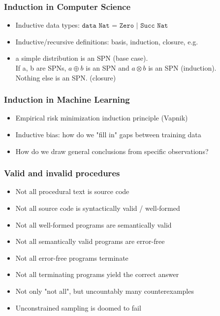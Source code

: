 \documentclass{beamer}
\begin{document}
  \begin{frame}
    \frametitle{Induction in Computer Science}
    \begin{itemize}
      \item Inductive data types: $\texttt{data Nat = Zero | Succ Nat}$
      \item Inductive/recursive definitions: basis, induction, closure, e.g.
      \item a simple distribution is an SPN (base case). \\If a, b are SPNs, $a \oplus b$ is an SPN and $a \otimes b$ is an SPN (induction).\\ Nothing else is an SPN. (closure)
    \end{itemize}
  \end{frame}

  \begin{frame}
    \frametitle{Induction in Machine Learning}
    \begin{itemize}
      \item Empirical risk minimization induction principle (Vapnik)
      \item Inductive bias: how do we "fill in" gaps between training data
      \item How do we draw general conclusions from specific observations?
    \end{itemize}
  \end{frame}


  \begin{frame}
    \frametitle{Valid and invalid procedures}
    \begin{itemize}
      \item Not all procedural text is source code
      \item Not all source code is syntactically valid / well-formed
      \item Not all well-formed programs are semantically valid
      \item Not all semantically valid programs are error-free
      \item Not all error-free programs terminate
      \item Not all terminating programs yield the correct answer
      \item Not only "not all", but uncountably many counterexamples
      \item Unconstrained sampling is doomed to fail
    \end{itemize}
  \end{frame}
\end{document}
